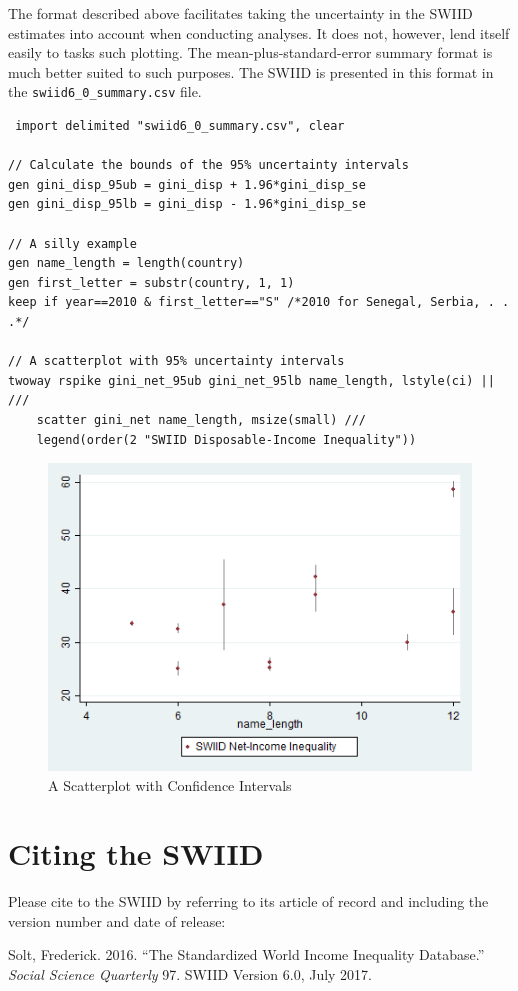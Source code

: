 \documentclass[11pt]{article}
\begin{document}
The format described above facilitates taking the uncertainty in the
SWIID estimates into account when conducting analyses. It does not,
however, lend itself easily to tasks such plotting. The
mean-plus-standard-error summary format is much better suited to such
purposes. The SWIID is presented in this format in the
\texttt{swiid6\_0\_summary.csv} file.


\begin{verbatim}
 import delimited "swiid6_0_summary.csv", clear
 
// Calculate the bounds of the 95% uncertainty intervals
gen gini_disp_95ub = gini_disp + 1.96*gini_disp_se
gen gini_disp_95lb = gini_disp - 1.96*gini_disp_se

// A silly example
gen name_length = length(country)
gen first_letter = substr(country, 1, 1)
keep if year==2010 & first_letter=="S" /*2010 for Senegal, Serbia, . . .*/

// A scatterplot with 95% uncertainty intervals
twoway rspike gini_net_95ub gini_net_95lb name_length, lstyle(ci) || ///
    scatter gini_net name_length, msize(small) ///
    legend(order(2 "SWIID Disposable-Income Inequality")) 
\end{verbatim}

\begin{figure}[htbp] 
	\caption{A Scatterplot with Confidence Intervals}
	\label{F:scatter}
	\includegraphics[width=6in]{stata_scatter.png}
\end{figure}

\pagebreak
\section{Citing the SWIID}

Please cite to the SWIID by referring to its article of record and including the version number and date of release:\\

\begin{hangparas}{.25in}{1}
Solt, Frederick.  2016.  ``The Standardized World Income Inequality Database.''  \emph{Social Science Quarterly} 97.  SWIID Version 6.0, July 2017.
\end{hangparas}




\pagebreak
\end{document}
